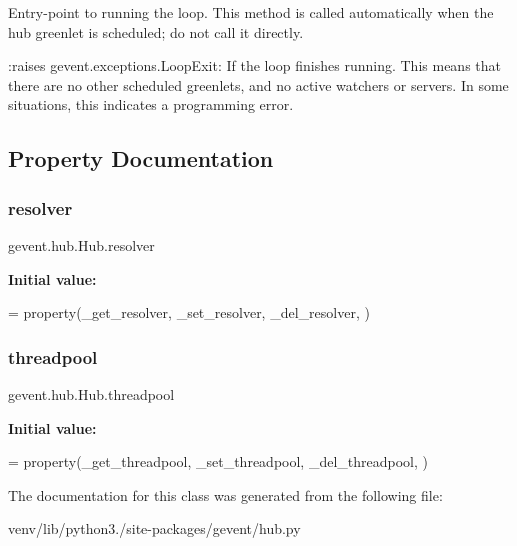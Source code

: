 \begin{DoxyVerb}Entry-point to running the loop. This method is called automatically
when the hub greenlet is scheduled; do not call it directly.

:raises gevent.exceptions.LoopExit: If the loop finishes running. This means
   that there are no other scheduled greenlets, and no active
   watchers or servers. In some situations, this indicates a
   programming error.
\end{DoxyVerb}
 

\subsection{Property Documentation}
\mbox{\label{classgevent_1_1hub_1_1_hub_a65add61f63e0ca8233b601fe0941f8d8}} 
\subsubsection{\texorpdfstring{resolver}{resolver}}
{\footnotesize\ttfamily gevent.\+hub.\+Hub.\+resolver\hspace{0.3cm}{\ttfamily [static]}}

{\bfseries Initial value\+:}
\begin{DoxyCode}
=  property(\_get\_resolver, \_set\_resolver, \_del\_resolver,
                        )
\end{DoxyCode}
\mbox{\label{classgevent_1_1hub_1_1_hub_afb12d9a586acbe2ccd7a023e7d38f9c1}} 
\subsubsection{\texorpdfstring{threadpool}{threadpool}}
{\footnotesize\ttfamily gevent.\+hub.\+Hub.\+threadpool\hspace{0.3cm}{\ttfamily [static]}}

{\bfseries Initial value\+:}
\begin{DoxyCode}
=  property(\_get\_threadpool, \_set\_threadpool, \_del\_threadpool,
                          )
\end{DoxyCode}


The documentation for this class was generated from the following file\+:\begin{DoxyCompactItemize}
\item 
venv/lib/python3./site-\/packages/gevent/hub.\+py\end{DoxyCompactItemize}
